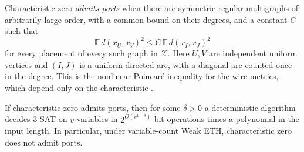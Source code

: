 Characteristic zero \emph{admits ports} when there are symmetric
regular multigraphs of arbitrarily large order, with a common bound
on their degrees, and a constant $C$ such that
\[
                 \mathbb E\,d(x_U,x_V)^2
                      \le C\,\mathbb E\,d(x_I,x_J)^2
\]
for every placement of every such graph in $\mathcal X$. Here $U,V$
are independent uniform vertices and $(I,J)$ is a uniform directed
arc, with a diagonal arc counted once in the degree. This is the
nonlinear Poincar\'e inequality for the wire metrics, which depend
only on the characteristic \cite[Definition~]{oaG}.

\begin{theorem}\label{thm:noports}
If characteristic zero admits ports, then for some $\delta>0$ a
deterministic algorithm decides 3-SAT on $v$ variables in
$2^{O(v^{1-\delta})}$ bit operations times a polynomial in the input
length. In particular, under variable-count Weak ETH, characteristic
zero does not admit ports.
\end{theorem}

